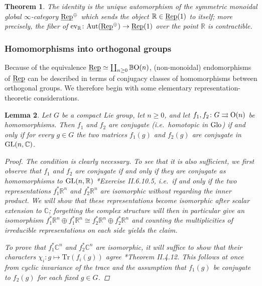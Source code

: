\documentclass[reqno]{memo-l}
\theoremstyle{mythm}
\newtheorem{thm}{Theorem}[section]
\newtheorem{lemma}[thm]{Lemma}
\theoremstyle{definition}
\numberwithin{equation}{section}
\newcommand{\R} {{\mathbb{R}}}
\newcommand{\C} {{\mathbb{C}}}
\DeclareMathOperator{\ev}{ev}
\newcommand{\GL}{{\textup{GL}}}
\renewcommand{\O}{{\textup{O}}}
\newcommand{\Glo}{\textup{Glo}}
\newcommand{\BGcat}[1]{\mathbb B{#1}}
\newcommand{\Aut}{\textup{Aut}}
\newcommand{\ulhelper}[2]{\underline{\setbox0=\hbox{$#1#2$}\dp0=0.4pt \box0\relax}}
\newcommand{\ul}[1]{{\mathpalette\ulhelper{#1}}\hbox{\rule[-2pt]{0pt}{0pt}}}
\newcommand{\Vect}{\textup{Rep}}
\begin{document}
\begin{thm}\label{thm:Aut-Vect-oplus}
    The identity is the unique automorphism of the symmetric monoidal global $\infty$-category $\ul\Vect^\oplus$ which sends the object $\R\in\ul\Vect(1)$ to itself; more precisely, the fiber of $\ev_{\R}\colon\Aut(\ul\Vect^\oplus)\to\ul\Vect(1)$ over the point $\R$ is contractible.
\end{thm}
\subsubsection{Homomorphisms into orthogonal groups}\label{subsubsec:reptheo} Because of the equivalence $\ul\Vect\simeq\coprod_{n\ge0}\BGcat{\O(n)}$, (non-monoidal) endomorphisms of $\ul\Vect$ can be described in terms of conjugacy classes of homomorphisms between orthogonal groups. We therefore begin with some elementary representation-theoretic considerations.

\begin{lemma}\label{lemma:conjugate-to-On}
    Let $G$ be a compact Lie group, let $n\ge0$, and let $f_1,f_2\colon G\rightrightarrows \O(n)$ be homomorphisms. Then $f_1$ and $f_2$ are conjugate (i.e.\ homotopic in $\Glo$) if and only if for every $g\in G$ the two matrices $f_1(g)$ and $f_2(g)$ are conjugate in $\GL(n,\C)$.
    \begin{proof}
        The condition is clearly necessary. To see that it is also sufficient, we first observe that $f_1$ and $f_2$ are conjugate if and only if they are conjugate as homomorphisms to $\GL(n,\R)$ \cite{broecker-tom-dieck}*{Exercise II.6.10.5}, i.e.\ if and only if the two representations $f_1^*\R^n$ and $f_2^*\R^n$ are isomorphic \emph{without} regarding the inner product. We will show that these representations become isomorphic after scalar extension to $\C$; forgetting the complex structure will then in particular give an isomorphism $f_1^*\R^n\oplus f_1^*\R^n\cong f_2^*\R^n\oplus f_2^*\R^n$ and counting the multiplicities of irreducible representations on each side yields the claim.

        To prove that $f_1^*\C^n$ and $f_2^*\C^n$ are isomorphic, it will suffice to show that their characters $\chi_i\colon g\mapsto\text{Tr}(f_i(g))$ agree \cite{broecker-tom-dieck}*{Theorem II.4.12}. This follows at once from cyclic invariance of the trace and the assumption that $f_1(g)$ be conjugate to $f_2(g)$ for each fixed $g\in G$.
    \end{proof}
\end{lemma}
\end{document}
